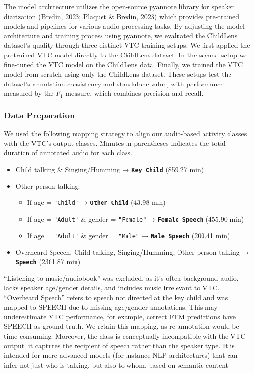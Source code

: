 \documentclass[
  man,floatsintext]{apa6}
\providecommand{\tightlist}{%
  \setlength{\itemsep}{0pt}\setlength{\parskip}{0pt}}
\begin{document}
The model architecture utilizes the open-source pyannote library for speaker diarization (Bredin, 2023; Plaquet \& Bredin, 2023) which provides pre-trained models and pipelines for various audio processing tasks. By adjusting the model architecture and training process using pyannote, we evaluated the ChildLens dataset's quality through three distinct VTC training setups: We first applied the pretrained VTC model directly to the ChildLens dataset. In the second setup we fine-tuned the VTC model on the ChildLens data. Finally, we trained the VTC model from scratch using only the ChildLens dataset. These setups test the dataset's annotation consistency and standalone value, with performance measured by the \(F_1\)-measure, which combines precision and recall.

\subsubsection{Data Preparation}\label{data-preparation-1}

We used the following mapping strategy to align our audio-based activity classes with the VTC's output classes. Minutes in parentheses indicates the total duration of annotated audio for each class.

\begin{itemize}
\tightlist
\item
  Child talking \& Singing/Humming → \textbf{\texttt{Key\ Child}} (859.27 min)
\item
  Other person talking:

  \begin{itemize}
  \tightlist
  \item
    If age = \texttt{"Child"} → \textbf{\texttt{Other\ Child}} (43.98 min)
  \item
    If age = \texttt{"Adult"} \& gender = \texttt{"Female"} → \textbf{\texttt{Female\ Speech}} (455.90 min)
  \item
    If age = \texttt{"Adult"} \& gender = \texttt{"Male"} → \textbf{\texttt{Male\ Speech}} (200.41 min)
  \end{itemize}
\item
  Overheard Speech, Child talking, Singing/Humming, Other person talking → \textbf{\texttt{Speech}} (2361.87 min)
\end{itemize}

``Listening to music/audiobook'' was excluded, as it's often background audio, lacks speaker age/gender details, and includes music irrelevant to VTC. ``Overheard Speech'' refers to speech not directed at the key child and was mapped to SPEECH due to missing age/gender annotations. This may underestimate VTC performance, for example, correct FEM predictions have SPEECH as ground truth. We retain this mapping, as re-annotation would be time-consuming. Moreover, the class is conceptually incompatible with the VTC output: it captures the recipient of speech rather than the speaker type. It is intended for more advanced models (for instance NLP architectures) that can infer not just who is talking, but also to whom, based on semantic content.
\end{document}
